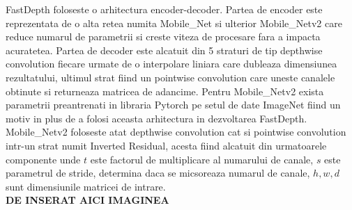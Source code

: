 \documentclass[12pt,a4paper]{report}
\begin{document}
FastDepth foloseste o arhitectura encoder-decoder. Partea de encoder este reprezentata de o alta 
retea numita Mobile\_Net si ulterior Mobile\_Netv2 care reduce numarul de parametrii si creste 
viteza de procesare fara a impacta acuratetea. Partea de decoder este alcatuit din 5 straturi de 
tip depthwise convolution fiecare urmate de o interpolare liniara care dubleaza dimensiunea 
rezultatului, ultimul strat fiind un pointwise convolution care uneste canalele obtinute  
si returneaza matricea de adancime. Pentru Mobile\_Netv2 exista parametrii preantrenati in libraria 
Pytorch pe setul de date ImageNet fiind un motiv in plus de a folosi aceasta arhitectura 
in dezvoltarea FastDepth. Mobile\_Netv2 foloseste atat depthwise convolution cat 
si pointwise convolution intr-un strat numit Inverted Residual, acesta fiind alcatuit din 
urmatoarele componente unde $ t $ este factorul de multiplicare al numarului de canale,
$ s $ este parametrul de stride, determina daca se micsoreaza numarul de canale, $ h, w, d $
sunt dimensiunile matricei de intrare.   \\
\textbf{DE INSERAT AICI IMAGINEA}

\end{document}
